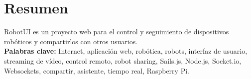 

\section*{Resumen}
\label{resumen}

RobotUI es un proyecto web para el control y seguimiento de dispositivos robóticos y compartirlos con otros usuarios.\\


\textbf{Palabras clave:} Internet, aplicación web, robótica, robots, interfaz de usuario, streaming de vídeo, control remoto, robot sharing, Sails.js, Node.js, Socket.io, Websockets, compartir, 
asistente, tiempo real, Raspberry Pi.
